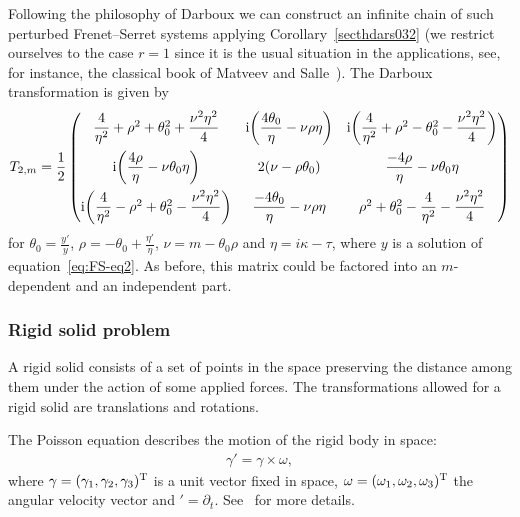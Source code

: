 \documentclass[10pt,a4paper]{amsart}
\numberwithin{equation}{section}
\begin{document}
Following the philosophy of Darboux we can construct an infinite chain of such perturbed Frenet--Serret systems applying Corollary~\ref{secthdars032} (we restrict ourselves to the case $r=1$ since it is the usual situation in the applications, see, for instance,
the classical book of Matveev and Salle~\cite{MaSa91a}). The Darboux transformation is given by
\begin{gather*}
T_{2,m} = \dfrac{1}{2} \begin{pmatrix} \dfrac{4}{\eta^2} + \rho^2 + \theta_0 ^2 + \dfrac{\nu^2 \eta^2}{4} & {\rm i} \bigg (\dfrac{4\theta_0 }{\eta} - \nu \rho \eta \bigg ) & {\rm i} \bigg ( \dfrac{4}{\eta^2} + \rho^2 - \theta_0 ^2 - \dfrac{\nu^2 \eta^2}{4} \bigg )\\[10pt]
{\rm i} \bigg ( \dfrac{4\rho}{\eta} - \nu \theta_0 \eta \bigg ) & 2 ( \nu -\rho \theta_0 ) & \dfrac{-4\rho}{\eta} - \nu \theta_0 \eta \\[10pt]
{\rm i} \bigg ( \dfrac{4}{\eta^2} - \rho^2 + \theta_0 ^2 - \dfrac{\nu^2 \eta^2}{4} \bigg ) & \dfrac{-4\theta_0 }{\eta} - \nu \rho \eta & \rho^2 + \theta_0 ^2 - \dfrac{4}{\eta^2} - \dfrac{\nu^2 \eta^2}{4}
\end{pmatrix}
\end{gather*}
for $\theta_0 = \frac{y'}{y}$, $\rho = -\theta_0 + \frac{\eta'}{\eta}$, $\nu=m -\theta_0 \rho$ and $\eta = i\kappa - \tau$, where $y$ is a solution of equation~\eqref{eq:FS-eq2}.
As before, this matrix could be factored into an $m$-dependent and an independent part.


\subsubsection{Rigid solid problem}

A rigid solid consists of a set of points in the space preserving the distance among them under the action of some applied forces. The transformations allowed for a rigid solid are translations and rotations.

The Poisson equation describes the motion of the rigid body in space:
\begin{gather*}
\gamma' = \gamma \times \omega ,
\end{gather*}
where $\gamma = (\gamma_1, \gamma_2, \gamma_3)^{\rm T}$ is a unit vector fixed in space, $\omega = (\omega_1, \omega_2, \omega_3)^{\rm T}$ the angular velocity vector and ${}' = \partial_t$. See~\cite{acjios, femapr, femapr0} for more details.
\end{document}
